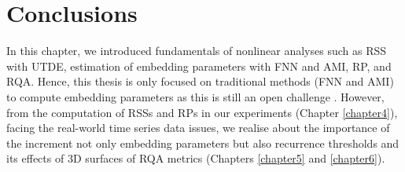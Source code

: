 \section{Conclusions}
In this chapter, we introduced fundamentals of nonlinear analyses such 
as RSS with UTDE, estimation of embedding parameters with FNN and AMI, RP, 
and RQA. Hence, this thesis is only focused on traditional methods 
(FNN and AMI) to compute embedding parameters 
as this is still an open challenge \citep{uzal2011, gomezgarcia2014}. 
However, from the computation of RSSs and RPs in our experiments
(Chapter \ref{chapter4}), facing the real-world time series data issues,
we realise about the importance of the increment not only embedding 
parameters \citep{iwanski1998} 
but also recurrence thresholds and its effects of 3D surfaces of RQA metrics
(Chapters \ref{chapter5} and \ref{chapter6}).


